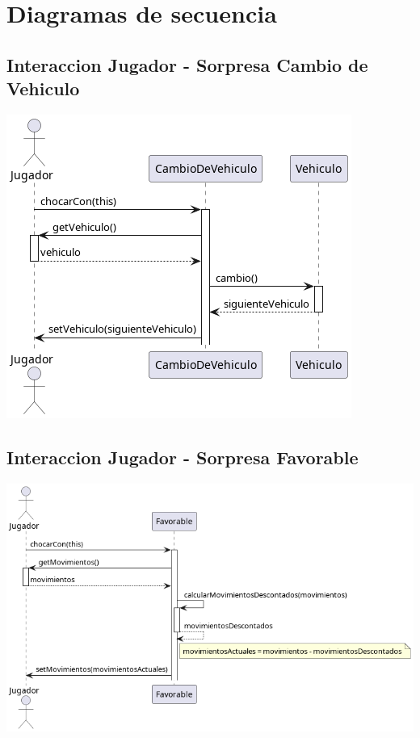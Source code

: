 \documentclass[titlepage,a4paper]{article}
\begin{document}
\section{Diagramas de secuencia}
\label{sec:orgbfb48c0}
\subsection{Interaccion Jugador - Sorpresa Cambio de Vehiculo}
\label{sec:org9f9f6f7}

\begin{center}
\includegraphics[width=.9\linewidth]{./diagramas/jugadorAvanzaYSeEncuentraConUnaSorpresaCambioDeVehiculo.png}
\end{center}

\subsection{Interaccion Jugador - Sorpresa Favorable}
\label{sec:orgfdc2329}

\begin{center}
\includegraphics[width=.9\linewidth]{./diagramas/jugadorAvanzaYSeEncuentraConUnaSorpresaFavorable.png}
\end{center}
\end{document}
